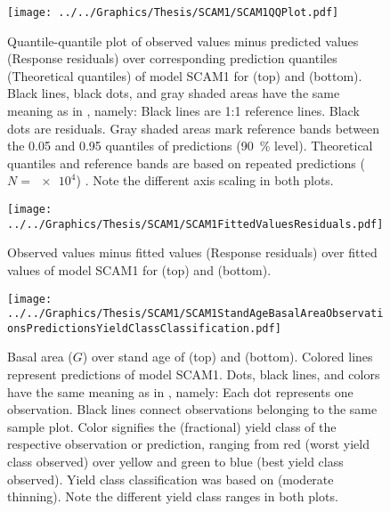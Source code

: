 \begin{figure}[h]
  \centering
  \texttt{[image: ../../Graphics/Thesis/SCAM1/SCAM1QQPlot.pdf]}
  \caption{Quantile-quantile plot of observed values minus predicted values (Response residuals) over corresponding prediction quantiles (Theoretical quantiles) of model SCAM1 for \Beech{} (top) and \Spruce{} (bottom).  Black lines, black dots, and gray shaded areas have the same meaning as in , namely:  Black lines are 1:1 reference lines.  Black dots are residuals.  Gray shaded areas mark reference bands between the \num{0.05} and \num{0.95} quantiles of predictions (\SI{90}{\percent} level).  Theoretical quantiles and reference bands are based on repeated predictions (\(N = \num{e4}\)) \parencite{Augustin2012}.  Note the different axis scaling in both plots.}
  \label{fig:SCAM1QQPlot}
\end{figure}

\begin{figure}[h]
  \centering
  \texttt{[image: ../../Graphics/Thesis/SCAM1/SCAM1FittedValuesResiduals.pdf]}
  \caption{Observed values minus fitted values (Response residuals) over fitted values of model SCAM1 for \Beech{} (top) and \Spruce{} (bottom).}
  \label{fig:SCAM1FittedValuesResiduals}
\end{figure}

\begin{figure}[h]
  \centering
  \texttt{[image: ../../Graphics/Thesis/SCAM1/SCAM1StandAgeBasalAreaObservationsPredictionsYieldClassClassification.pdf]}
  \caption{Basal area (\(G\)) over stand age of \Beech{} (top) and \Spruce{} (bottom).  Colored lines represent predictions of model SCAM1.  Dots, black lines, and colors have the same meaning as in , namely:  Each dot represents one observation.  Black lines connect observations belonging to the same sample plot.  Color signifies the (fractional) yield class of the respective observation or prediction, ranging from red (worst yield class observed) over yellow and green to blue (best yield class observed). Yield class classification was based on \textcite{Schober1995} (moderate thinning).  Note the different yield class ranges in both plots.}
  \label{fig:SCAM1StandAgeBasalAreaObservationsPredictionsYieldClassClassification}
\end{figure}

